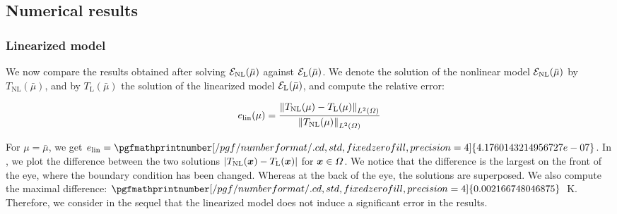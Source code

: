\subsection{Numerical results}
\label{sec:numerical-results}






\subsubsection{Linearized model}
\label{sec:linearized-model}

We now compare the results obtained after solving $\mathcal{E}_\text{NL}(\bar{\mu})$ against $\mathcal{E}_\text{L}(\bar{\mu})$.
We denote the solution of the nonlinear model $\mathcal{E}_\text{NL}(\bar{\mu})$ by $T_\text{NL}(\bar{\mu})$,
and by $T_\text{L}(\bar{\mu})$ the solution of the linearized model $\mathcal{E}_\text{L}(\bar{\mu})$,
and compute the relative error:

\begin{equation}
    e_\text{lin}(\mu) = \dfrac{\left\Vert T_\text{NL}(\mu)-T_\text{L}(\mu)\right\Vert_{L^2(\Omega)}}{\left\Vert T_\text{NL}(\mu)\right\Vert_{L^2(\Omega)}}
\end{equation}

For $\mu=\bar{\mu}$, we get $e_\text{lin} = \pgfmathprintnumber[/pgf/number format/.cd, std, fixed zerofill, precision=4]{4.1760143214956727e-07}$.
In , we plot the difference between the two solutions $|T_\text{NL}(\x) - T_\text{L}(\x)|$ for $\x\in\Omega$.
We notice that the difference is the largest on the front of the eye, where the boundary condition has been changed.
Whereas at the back of the eye, the solutions are superposed.
We also compute the maximal difference: $\pgfmathprintnumber[/pgf/number format/.cd,std,fixed zerofill,precision=4]{0.002166748046875}$~\unit{\kelvin}.
Therefore, we consider in the sequel that the linearized model does not induce a significant error in the results.


